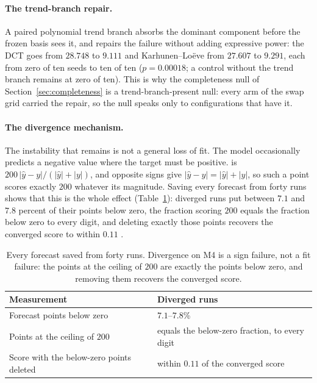 \paragraph{The trend-branch repair.}
A paired polynomial trend branch absorbs the dominant component before the frozen basis sees it,
and repairs the failure without adding expressive power: the DCT goes from $28.748$ to $9.111$
\smape{} and Karhunen--Lo\"eve from $27.607$ to $9.291$, each from zero of ten seeds to ten of
ten ($p = 0.00018$; a control without the trend branch remains at zero of ten). This is why the
completeness null of Section~\ref{sec:completeness} is a trend-branch-present null: every arm of
the swap grid carried the repair, so the null speaks only to configurations that have it.

\paragraph{The divergence mechanism.}
The instability that remains is not a general loss of fit. The model occasionally predicts a
negative value where the target must be positive. \smape{} is
$200\,|\hat{y}-y|/(|\hat{y}|+|y|)$, and opposite signs give $|\hat{y}-y| = |\hat{y}|+|y|$, so
such a point scores exactly $200$ whatever its magnitude. Saving every forecast from forty runs
shows that this is the whole effect (Table~\ref{tab:sign_failure}): diverged runs put between
$7.1$ and $7.8$ percent of their points below zero, the fraction scoring $200$ equals the
fraction below zero to every digit, and deleting exactly those points recovers the converged
score to within $0.11$ \smape.

\begin{table}[t]
  \centering
  \caption{Every forecast saved from forty runs. Divergence on M4 is a sign failure, not a fit
  failure: the points at the \smape{} ceiling of $200$ are exactly the points below zero, and
  removing them recovers the converged score.}
  \label{tab:sign_failure}
  \begin{tabular}{@{}ll@{}}
    \toprule
    Measurement & Diverged runs \\
    \midrule
    Forecast points below zero & $7.1$--$7.8$\% \\
    Points at the \smape{} ceiling of $200$ & equals the below-zero fraction, to every digit \\
    Score with the below-zero points deleted & within $0.11$ \smape{} of the converged score \\
    \bottomrule
  \end{tabular}
\end{table}

